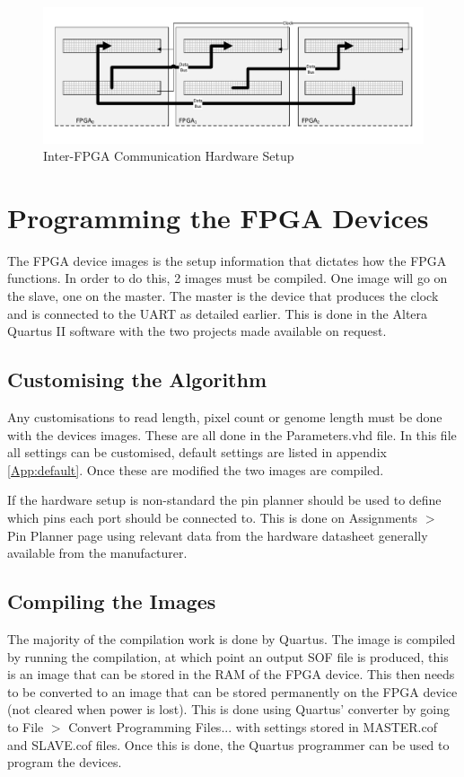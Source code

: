 \begin{figure}[p]
  \includegraphics[width=\textwidth]{./figs/interfpga.pdf}
  \caption{Inter-FPGA Communication Hardware Setup}
\end{figure}

\section{Programming the FPGA Devices}


The FPGA device images is the setup information that dictates how the FPGA functions. In order to do this, 2 images must be compiled. One image will go on the slave, one on the master. The master is the device that produces the clock and is connected to the UART as detailed earlier. This is done in the Altera Quartus II software with the two projects made available on request. 
\subsection{Customising the Algorithm}

Any customisations to read length, pixel count or genome length must be done with the devices images. These are all done in the Parameters.vhd file. In this file all settings can be customised, default settings are listed in appendix \ref{App:default}. Once these are modified the two images are compiled. 

If the hardware setup is non-standard the pin planner should be used to define which pins each port should be connected to. This is done on Assignments $>$ Pin Planner page using relevant data from the hardware datasheet generally available from the manufacturer. 


\subsection{Compiling the Images}

The majority of the compilation work is done by Quartus. The image is compiled by running the compilation, at which point an output SOF file is produced, this is an image that can be stored in the RAM of the FPGA device. This then needs to be converted to an image that can be stored permanently on the FPGA device (not cleared when power is lost). This is done using Quartus' converter by going to File $>$ Convert Programming Files... with settings stored in MASTER.cof and SLAVE.cof files. Once this is done, the Quartus programmer can be used to program the devices.


